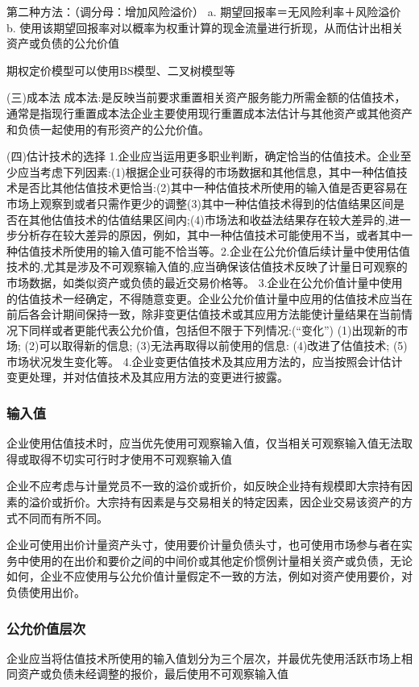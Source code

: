 \documentclass[UTF8,12pt]{ctexart}
\numberwithin{equation}{section} %
\numberwithin{figure}{section}
\numberwithin{table}{section}
\begin{document}
	第二种方法：（调分母：增加风险溢价）
	a.	期望回报率＝无风险利率＋风险溢价
	b.	使用该期望回报率对以概率为权重计算的现金流量进行折现，从而估计出相关资产或负债的公允价值
	
	期权定价模型可以使用BS模型、二叉树模型等
	
	(三)成本法
	成本法:是反映当前要求重置相关资产服务能力所需金额的估值技术，通常是指现行重置成本法企业主要使用现行重置成本法估计与其他资产或其他资产和负债一起使用的有形资产的公允价值。
	
	(四)估计技术的选择
	1.企业应当运用更多职业判断，确定恰当的估值技术。企业至少应当考虑下列因素:(1)根据企业可获得的市场数据和其他信息，其中一种估值技术是否比其他估值技术更恰当:(2)其中一种估值技术所使用的输入值是否更容易在市场上观察到或者只需作更少的调整(3)其中一种估值技术得到的估值结果区间是否在其他估值技术的估值结果区间内;(4)市场法和收益法结果存在较大差异的,进一步分析存在较大差异的原因，例如，其中一种估值技术可能使用不当，或者其中一种估值技术所使用的输入值可能不恰当等。2.企业在公允价值后续计量中使用估值技术的,尤其是涉及不可观察输入值的,应当确保该估值技术反映了计量日可观察的市场数据，如类似资产或负债的最近交易价格等。
	3.企业在公允价值计量中使用的估值技术一经确定，不得随意变更。企业公允价值计量中应用的估值技术应当在前后各会计期间保持一致，除非变更估值技术或其应用方法能使计量结果在当前情况下同样或者更能代表公允价值，包括但不限于下列情况:(“变化”)
	(1)出现新的市场;
	(2)可以取得新的信息;
	(3)无法再取得以前使用的信息:
	(4)改进了估值技术;
	(5)市场状况发生变化等。
	4.企业变更估值技术及其应用方法的，应当按照会计估计变更处理，并对估值技术及其应用方法的变更进行披露。
	
	
	\subsubsection{输入值}
	企业使用估值技术时，应当优先使用可观察输入值，仅当相关可观察输入值无法取得或取得不切实可行时才使用不可观察输入值
	
	企业不应考虑与计量党员不一致的溢价或折价，如反映企业持有规模即大宗持有因素的溢价或折价。大宗持有因素是与交易相关的特定因素，因企业交易该资产的方式不同而有所不同。
	
	企业可使用出价计量资产头寸，使用要价计量负债头寸，也可使用市场参与者在实务中使用的在出价和要价之间的中间价或其他定价惯例计量相关资产或负债，无论如何，企业不应使用与公允价值计量假定不一致的方法，例如对资产使用要价，对负债使用出价。
	
	\subsubsection{公允价值层次}
	企业应当将估值技术所使用的输入值划分为三个层次，并最优先使用活跃市场上相同资产或负债未经调整的报价，最后使用不可观察输入值
	
\end{document}
